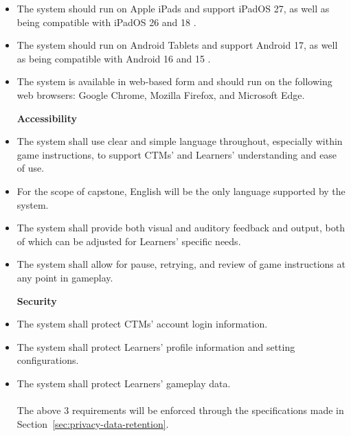 \documentclass[12pt]{article}
\newcounter{nfrnum} %
\begin{document}
\begin{itemize}
  \setcounter{nfrnum}{0}
  \item[\refstepcounter{nfrnum}\thenfrnum \label{NFR-PORT-1}:] The system should run on Apple iPads and support iPadOS 27, as well as being compatible with iPadOS 26 and 18 \citep{moodupAppVersion}.
  \item[\refstepcounter{nfrnum}\thenfrnum \label{NFR-PORT-2}:] The system should run on Android Tablets and support Android 17, as well as being compatible with Android 16 and 15 \citep{moodupAppVersion}.
  \item[\refstepcounter{nfrnum}\thenfrnum \label{NFR-PORT-3}:] The system is available in web-based form and should run on the following web browsers: Google Chrome, Mozilla Firefox, and Microsoft Edge.
  
  \textbf{Accessibility}
  
  \setcounter{nfrnum}{0}
  \item[\refstepcounter{nfrnum}\thenfrnum \label{NFR-ACCESS-1}:] The system shall use clear and simple language throughout, especially within game instructions, to support CTMs' and Learners' understanding and ease of use.
  \item[\refstepcounter{nfrnum}\thenfrnum \label{NFR-ACCESS-2}:] For the scope of capstone, English will be the only language supported by the system.
  \item[\refstepcounter{nfrnum}\thenfrnum \label{NFR-ACCESS-3}:] The system shall provide both visual and auditory feedback and output, both of which can be adjusted for Learners' specific needs.
  \item[\refstepcounter{nfrnum}\thenfrnum \label{NFR-ACCESS-4}:] The system shall allow for pause, retrying, and review of game instructions at any point in gameplay.
  
  \textbf{Security}
  
  \setcounter{nfrnum}{0}
  \item[\refstepcounter{nfrnum}\thenfrnum \label{NFR-SEC-1}:] The system shall protect CTMs' account login information.
  \item[\refstepcounter{nfrnum}\thenfrnum \label{NFR-SEC-2}:] The system shall protect Learners' profile information and setting configurations.
  \item[\refstepcounter{nfrnum}\thenfrnum \label{NFR-SEC-3}:] The system shall protect Learners' gameplay data.
  \\\\
  The above 3 requirements will be enforced through the specifications made in Section~\ref{sec:privacy-data-retention}.
  

\end{itemize}
\end{document}

